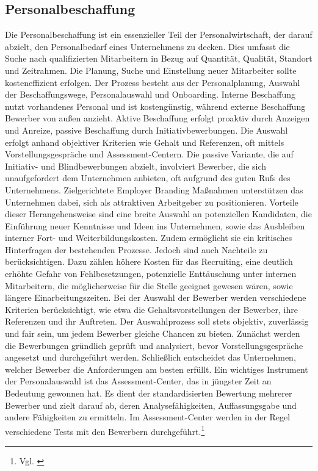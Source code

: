 \subsection{Personalbeschaffung}
\label{sec:personalbeschaffung} %
Die Personalbeschaffung ist ein essenzieller Teil der Personalwirtschaft, der darauf abzielt, den Personalbedarf eines Unternehmens zu decken. Dies umfasst die Suche nach qualifizierten Mitarbeitern in Bezug auf Quantität, Qualität, Standort und Zeitrahmen. Die Planung, Suche und Einstellung neuer Mitarbeiter sollte kosteneffizient erfolgen. Der Prozess besteht aus der Personalplanung, Auswahl der Beschaffungswege, Personalauswahl und Onboarding. Interne Beschaffung nutzt vorhandenes Personal und ist kostengünstig, während externe Beschaffung Bewerber von außen anzieht. Aktive Beschaffung erfolgt proaktiv durch Anzeigen und Anreize, passive Beschaffung durch Initiativbewerbungen. Die Auswahl erfolgt anhand objektiver Kriterien wie Gehalt und Referenzen, oft mittels Vorstellungsgespräche und Assessment-Centern. Die passive Variante, die auf Initiativ- und Blindbewerbungen abzielt, involviert Bewerber, die sich unaufgefordert dem Unternehmen anbieten, oft aufgrund des guten Rufs des Unternehmens. Zielgerichtete Employer Branding Maßnahmen unterstützen das Unternehmen dabei, sich als attraktiven Arbeitgeber zu positionieren. Vorteile dieser Herangehensweise sind eine breite Auswahl an potenziellen Kandidaten, die Einführung neuer Kenntnisse und Ideen ins Unternehmen, sowie das Ausbleiben interner Fort- und Weiterbildungskosten. Zudem ermöglicht sie ein kritisches Hinterfragen der bestehenden Prozesse. Jedoch sind auch Nachteile zu berücksichtigen. Dazu zählen höhere Kosten für das Recruiting, eine deutlich erhöhte Gefahr von Fehlbesetzungen, potenzielle Enttäuschung unter internen Mitarbeitern, die möglicherweise für die Stelle geeignet gewesen wären, sowie längere Einarbeitungszeiten. Bei der Auswahl der Bewerber werden verschiedene Kriterien berücksichtigt, wie etwa die Gehaltsvorstellungen der Bewerber, ihre Referenzen und ihr Auftreten. Der Auswahlprozess soll stets objektiv, zuverlässig und fair sein, um jedem Bewerber gleiche Chancen zu bieten. Zunächst werden die Bewerbungen gründlich geprüft und analysiert, bevor Vorstellungsgespräche angesetzt und durchgeführt werden. Schließlich entscheidet das Unternehmen, welcher Bewerber die Anforderungen am besten erfüllt. Ein wichtiges Instrument der Personalauswahl ist das Assessment-Center, das in jüngster Zeit an Bedeutung gewonnen hat. Es dient der standardisierten Bewertung mehrerer Bewerber und zielt darauf ab, deren Analysefähigkeiten, Auffassungsgabe und andere Fähigkeiten zu ermitteln. Im Assessment-Center werden in der Regel verschiedene Tests mit den Bewerbern durchgeführt.\footnote{Vgl. \cite{Studyflix2024}} 


